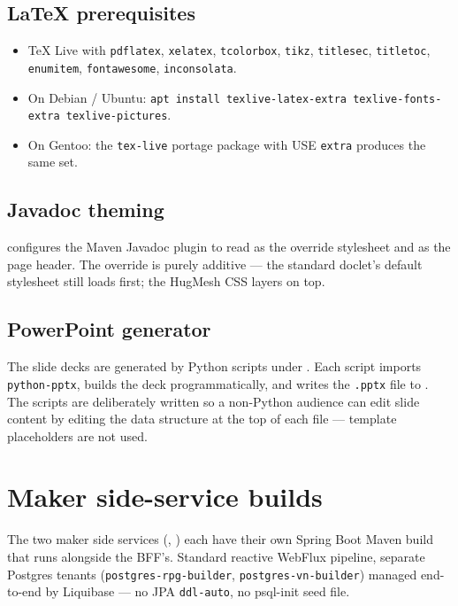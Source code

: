 \subsection{LaTeX prerequisites}

\begin{itemize}
  \item TeX Live with \texttt{pdflatex}, \texttt{xelatex},
        \texttt{tcolorbox}, \texttt{tikz}, \texttt{titlesec},
        \texttt{titletoc}, \texttt{enumitem}, \texttt{fontawesome},
        \texttt{inconsolata}.
  \item On Debian / Ubuntu: \texttt{apt install texlive-latex-extra
        texlive-fonts-extra texlive-pictures}.
  \item On Gentoo: the \texttt{tex-live} portage package with USE
        \texttt{extra} produces the same set.
\end{itemize}

\subsection{Javadoc theming}

 configures the Maven Javadoc plugin to read
 as the override
stylesheet and  as
the page header. The override is purely additive — the standard doclet's
default stylesheet still loads first; the HugMesh CSS layers on top.

\subsection{PowerPoint generator}

The slide decks are generated by Python scripts under
. Each script imports
\texttt{python-pptx}, builds the deck programmatically, and writes the
\texttt{.pptx} file to . The
scripts are deliberately written so a non-Python audience can edit slide
content by editing the data structure at the top of each file —
template placeholders are not used.

\section{Maker side-service builds}

The two maker side services (, )
each have their own Spring Boot Maven build that runs alongside the
BFF's. Standard reactive WebFlux pipeline, separate Postgres tenants
(\texttt{postgres-rpg-builder}, \texttt{postgres-vn-builder}) managed
end-to-end by Liquibase --- no JPA \texttt{ddl-auto}, no psql-init
seed file.

